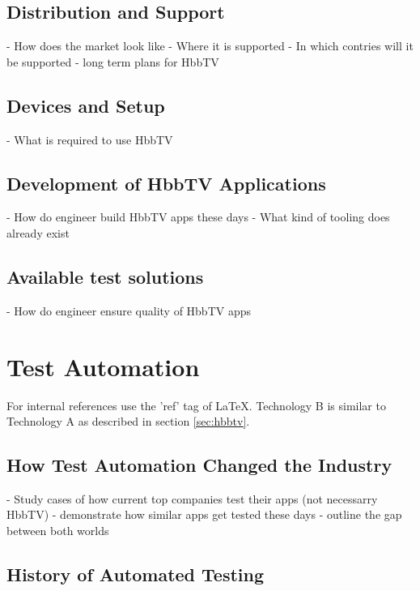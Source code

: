 \subsection{Distribution and Support\label{sec:distandsup}}

- How does the market look like
- Where it is supported
- In which contries will it be supported
- long term plans for HbbTV

\subsection{Devices and Setup\label{sec:deviceandsetup}}

- What is required to use HbbTV

\subsection{Development of HbbTV Applications\label{sec:devofhbbtv}}

- How do engineer build HbbTV apps these days
- What kind of tooling does already exist

\subsection{Available test solutions\label{sec:availabletestsolutions}}

- How do engineer ensure quality of HbbTV apps

\section{Test Automation\label{sec:testautomation}}

For internal references use the 'ref' tag of LaTeX. Technology B is similar to Technology A
as described in section \ref{sec:hbbtv}.

\subsection{How Test Automation Changed the Industry\label{sec:howitchanged}}

- Study cases of how current top companies test their apps (not necessarry HbbTV)
- demonstrate how similar apps get tested these days
- outline the gap between both worlds

\subsection{History of Automated Testing\label{sec:history}}


